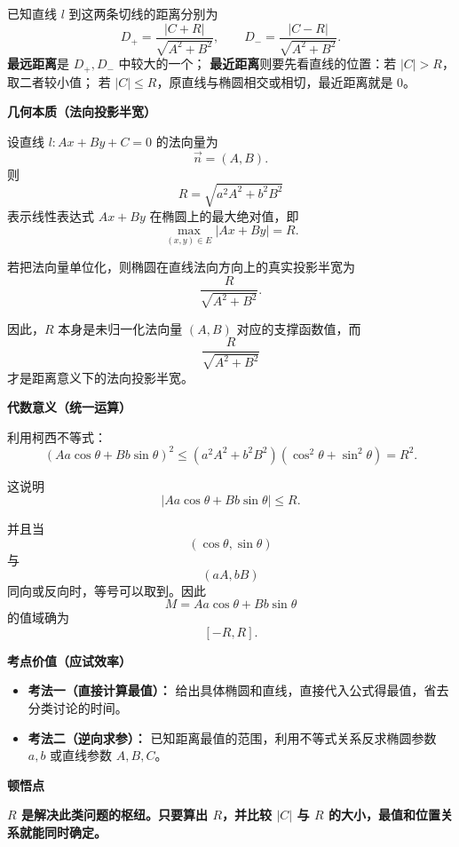 \begin{explanationbox}
	已知直线 \(l\) 到这两条切线的距离分别为
	\[
		D_+=\frac{|C+R|}{\sqrt{A^2+B^2}},\qquad
		D_-=\frac{|C-R|}{\sqrt{A^2+B^2}}.
	\]
	\textbf{最远距离}是 \(D_+,D_-\) 中较大的一个；
	\textbf{最近距离}则要先看直线的位置：若 \(|C|>R\)，取二者较小值；
	若 \(|C|\le R\)，原直线与椭圆相交或相切，最近距离就是 \(0\)。

	\medskip

	\textbf{\textcolor{CExplanation}{几何本质（法向投影半宽）}}

	设直线 \(l:Ax+By+C=0\) 的法向量为
	\[
		\vec n=(A,B).
	\]
	则
	\[
		R=\sqrt{a^2A^2+b^2B^2}
	\]
	表示线性表达式 \(Ax+By\) 在椭圆上的最大绝对值，即
	\[
		\max_{(x,y)\in E}|Ax+By|=R.
	\]

	若把法向量单位化，则椭圆在直线法向方向上的真实投影半宽为
	\[
		\frac{R}{\sqrt{A^2+B^2}}.
	\]

	因此，\(R\) 本身是未归一化法向量 \((A,B)\) 对应的支撑函数值，而
	\[
		\frac{R}{\sqrt{A^2+B^2}}
	\]
	才是距离意义下的法向投影半宽。

	\medskip

	\textbf{\textcolor{CExplanation}{代数意义（统一运算）}}

	利用柯西不等式：
	\[
		(Aa\cos\theta+Bb\sin\theta)^2
		\le
		(a^2A^2+b^2B^2)(\cos^2\theta+\sin^2\theta)
		=
		R^2.
	\]

	这说明
	\[
		|Aa\cos\theta+Bb\sin\theta|\le R.
	\]

	并且当
	\[
		(\cos\theta,\sin\theta)
	\]
	与
	\[
		(aA,bB)
	\]
	同向或反向时，等号可以取到。因此
	\[
		M=Aa\cos\theta+Bb\sin\theta
	\]
	的值域确为
	\[
		[-R,R].
	\]

	\medskip

	\textbf{\textcolor{CExplanation}{考点价值（应试效率）}}

	\begin{itemize}[leftmargin=*, itemsep=0.5em, topsep=0.4em]
		\item \textbf{考法一（直接计算最值）：}
		      给出具体椭圆和直线，直接代入公式得最值，省去分类讨论的时间。

		\item \textbf{考法二（逆向求参）：}
		      已知距离最值的范围，利用不等式关系反求椭圆参数 \(a,b\) 或直线参数 \(A,B,C\)。
	\end{itemize}

	\medskip

	\textbf{\textcolor{CExplanation}{顿悟点}}

	\textbf{\(R\) 是解决此类问题的枢纽。只要算出 \(R\)，并比较 \(|C|\) 与 \(R\) 的大小，最值和位置关系就能同时确定。}


\end{explanationbox}
